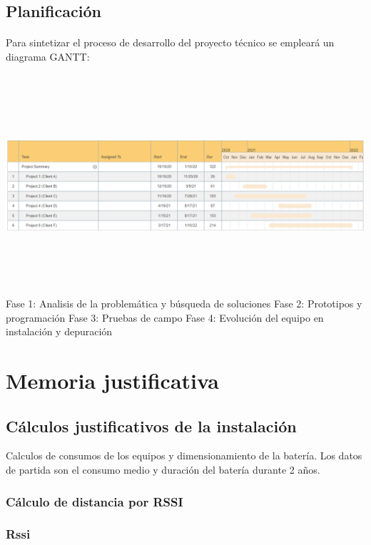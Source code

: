\documentclass[a4paper ,12pt, onecolumn]{article}
\begin{document}
    \subsection{Planificación}
        \paragraph{}
        Para sintetizar el proceso de desarrollo del proyecto técnico se empleará un diagrama GANTT: 
        \paragraph{}
        \includegraphics[width=15cm, height=8cm]{gantt.PNG}
        Fase 1: Analisis de la problemática y búsqueda de soluciones
        Fase 2: Prototipos y programación
        Fase 3: Pruebas de campo
        Fase 4: Evolución del equipo en instalación y depuración 
\section{Memoria justificativa}
    \subsection{Cálculos justificativos de la instalación}
        Calculos de consumos de los equipos y dimensionamiento de la batería.
        Los datos de partida son el consumo medio y duración del batería durante 2 años.
        \subsubsection{Cálculo de distancia por RSSI}
            \subsubsection{Rssi}
\end{document}
